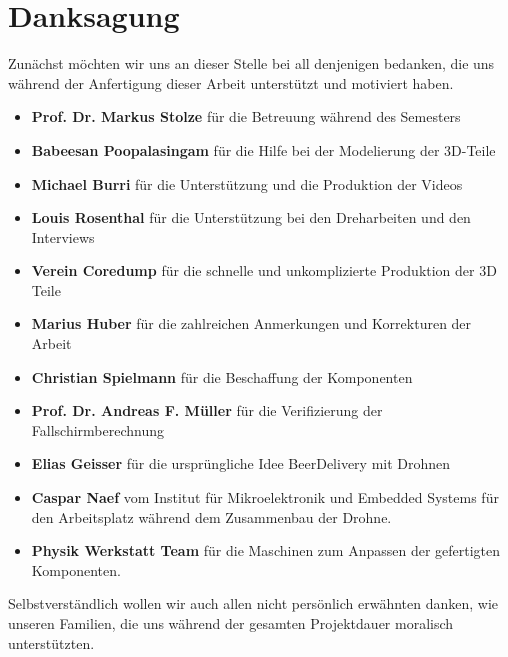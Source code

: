 \newpage
{}
\chapter*{Danksagung}
Zunächst möchten wir uns an dieser Stelle bei all denjenigen bedanken, die uns während der Anfertigung dieser Arbeit unterstützt und motiviert haben.
\begin{itemize}
	\item{\textbf{Prof. Dr. Markus Stolze} für die Betreuung während des Semesters}
	\item{\textbf{Babeesan Poopalasingam} für die Hilfe bei der Modelierung der 3D-Teile}
	\item{\textbf{Michael Burri} für die Unterstützung und die Produktion der Videos}
	\item{\textbf{Louis Rosenthal} für die Unterstützung bei den Dreharbeiten und den Interviews}
	\item{\textbf{Verein Coredump} für die schnelle und unkomplizierte Produktion der 3D Teile}
	\item{\textbf{Marius Huber} für die zahlreichen Anmerkungen und Korrekturen  der Arbeit}
    \item{\textbf{Christian Spielmann} für die Beschaffung der Komponenten}
	\item{\textbf{Prof. Dr. Andreas F. Müller} für die Verifizierung der Fallschirmberechnung}
	\item{\textbf{Elias Geisser} für die ursprüngliche Idee BeerDelivery mit Drohnen}
	\item{\textbf{Caspar Naef} vom Institut für Mikroelektronik und Embedded Systems für den Arbeitsplatz während dem Zusammenbau der Drohne.}
	\item{\textbf{Physik Werkstatt Team} für die Maschinen zum Anpassen der gefertigten Komponenten.}
\end{itemize}
Selbstverständlich wollen wir auch allen nicht persönlich erwähnten danken, wie unseren Familien, die uns während der gesamten Projektdauer moralisch unterstützten.